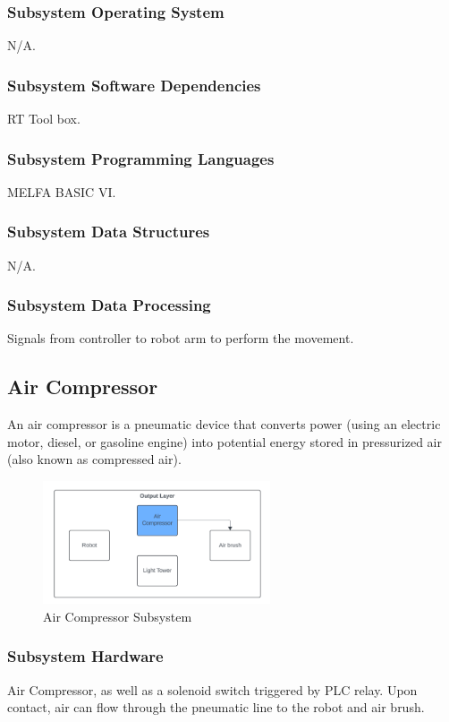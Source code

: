 \subsubsection{Subsystem Operating System}
N/A.

\subsubsection{Subsystem Software Dependencies}
RT Tool box.

\subsubsection{Subsystem Programming Languages}
MELFA BASIC VI.

\subsubsection{Subsystem Data Structures}
N/A.

\subsubsection{Subsystem Data Processing}
Signals from controller to robot arm to perform the movement.


\subsection{Air Compressor}
An air compressor is a pneumatic device that converts power (using an electric motor, diesel, or gasoline engine) into potential energy stored in pressurized air (also known as compressed air).

\begin{figure}[h!]
	\centering
 	\includegraphics[width=0.60\textwidth]{images/AirCompressor_ouput.png}
 \caption{Air Compressor Subsystem}
\end{figure}

\subsubsection{Subsystem Hardware}
Air Compressor, as well as a solenoid switch triggered by PLC relay. Upon contact, air can flow through the pneumatic line to the robot and air brush.

